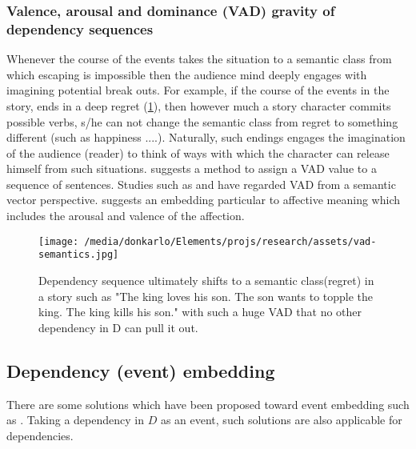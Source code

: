 \documentclass{article}
\begin{document}
	\subsubsection{Valence, arousal and dominance (VAD) gravity of dependency sequences}
	Whenever the course of the events takes the situation to a semantic class from which escaping is impossible then the audience mind deeply engages with imagining potential break outs. For example, if the course of the events in the story, ends in a deep regret (\ref{fig:semantical-class-shift}), then however much a story character commits possible verbs, s/he can not change the semantic class from regret to something different (such as happiness ....). Naturally, such endings engages the imagination of the audience (reader) to think of ways with which the character can release himself from such situations. \citet{buechel-2016-feelings-from-the-past-adapting-affective-lexicons-for-historical-emotion-analysis} suggests a method to assign a VAD value to a sequence of sentences. Studies such as \citet{agrawal-2018-learning-emotion-enriched-word-representations,mao-2019-sentiment-aware-word-embedding-for-emotion-classification} and 
	\citet{li-2017-inferring-affective-meanings-of-words-from-word-embedding} have regarded VAD from a semantic vector perspective. \citet{li-2017-inferring-affective-meanings-of-words-from-word-embedding} suggests an embedding particular to affective meaning which includes the arousal and valence of the affection.
	\begin{figure}[h!]
		\centering
		\texttt{[image: /media/donkarlo/Elements/projs/research/assets/vad-semantics.jpg]}
		\caption{Dependency sequence ultimately shifts to a semantic class(regret) in a story such as "The king loves his son. The son wants to topple the king. The king kills his son." with such a huge VAD that no other dependency in D can pull it out.} 
		\label{fig:semantical-class-shift}
	\end{figure}
	
	
	\subsection{Dependency (event) embedding} \label{sec:related-works-dependeny-embedding}
	There are some solutions which have been proposed toward event embedding such as
	\citet{weber-2018-event-representations-with-tensor-based-compositions}. Taking a dependency in $D$ as an event, such solutions are also applicable for dependencies. 
	
\end{document}
